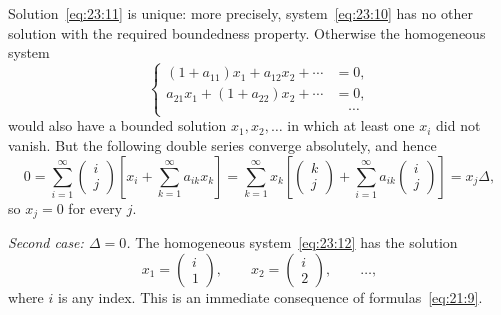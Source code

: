 \documentclass[
  paper=b5,
  fontsize=13pt,
  twoside=true,
  open=any,
  bookmarkpackage=false,
  chapterprefix=true,
  headings=normal
]{scrbook}
\theoremstyle{definition}
\begin{document}
Solution~\eqref{eq:23:11} is unique: more precisely, system~\eqref{eq:23:10} has no other solution with the required boundedness property. Otherwise the homogeneous system
\begin{equation}
\left\{
\begin{aligned}
 (1+a_{11})x_1+a_{12}x_2+\cdots&=0,\\
 a_{21}x_1+(1+a_{22})x_2+\cdots&=0,\\
 &\hspace{1em}\cdots
\end{aligned}
\right.
\tag{12}\label{eq:23:12}
\end{equation}
would also have a bounded solution $x_1,x_2,\ldots$ in which at least one $x_i$ did not vanish. But the following double series converge absolutely, and hence
\[
 0=\sum_{i=1}^{\infty}
 \left(\begin{matrix}i\\j\end{matrix}\right)
 \left[x_i+\sum_{k=1}^{\infty}a_{ik}x_k\right]
 =\sum_{k=1}^{\infty}x_k
 \left[
 \left(\begin{matrix}k\\j\end{matrix}\right)
 +\sum_{i=1}^{\infty}a_{ik}
 \left(\begin{matrix}i\\j\end{matrix}\right)
 \right]
 =x_j\Delta,
\]
so $x_j=0$ for every $j$.

\emph{Second case: $\Delta=0$.} The homogeneous system~\eqref{eq:23:12} has the solution
\begin{equation}
 x_1=\left(\begin{matrix}i\\1\end{matrix}\right),\qquad
 x_2=\left(\begin{matrix}i\\2\end{matrix}\right),\qquad\ldots,
 \tag{13}\label{eq:23:13}
\end{equation}
where $i$ is any index. This is an immediate consequence of formulas~\eqref{eq:21:9}.
\end{document}
